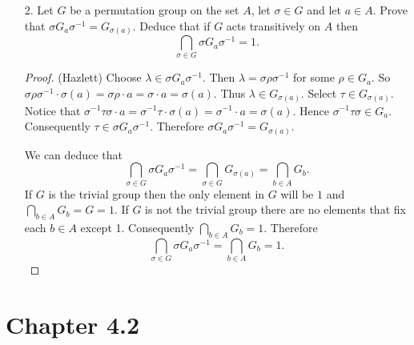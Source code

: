 \documentclass[10pt]{article}
\newcommand\inv{^{-1}}
\begin{document}
\begin{itemize}
\begin{proof}
\end{proof}

\item[2.] Let $G$ be a permutation group on the set $A$, let $\sigma \in G$ and let $a \in A$.  Prove that $\sigma G_a\sigma\inv = G_{\sigma(a)}$.  Deduce that if $G$ acts transitively on $A$ then $$\bigcap_{\sigma \in G}\sigma G_a\sigma\inv = 1.$$

\begin{proof}(Hazlett)
Choose $\lambda \in \sigma G_a\sigma\inv$.  Then $\lambda = \sigma
\rho \sigma\inv$ for some $\rho \in G_a$.  So $\sigma\rho \sigma\inv
\cdot \sigma(a) = \sigma\rho\cdot a = \sigma \cdot a = \sigma(a)$.
Thus $\lambda \in G_{\sigma(a)}$.  Select $\tau \in G_{\sigma(a)}$.
Notice that $\sigma\inv\tau\sigma\cdot a = \sigma\inv\tau
\cdot\sigma(a) = \sigma\inv \cdot a = \sigma(a)$.  Hence
$\sigma\inv\tau\sigma \in G_a$.  Consequently $\tau \in \sigma
G_a\sigma\inv$.  Therefore $\sigma G_a\sigma\inv = G_{\sigma(a)}$.

We can deduce that $$\bigcap_{\sigma \in G}\sigma G_a\sigma\inv =
\bigcap_{\sigma \in G} G_{\sigma(a)} = \bigcap_{b \in A} G_b.$$  If
$G$ is the trivial group then the only element in $G$ will be $1$
and $\bigcap_{b \in A} G_b = G = 1$.  If $G$ is not the trivial
group there are no elements that fix each $b \in A$ except 1.
Consequently $\bigcap_{b \in A} G_b = 1$.  Therefore
$$\bigcap_{\sigma \in G}\sigma G_a\sigma\inv = \bigcap_{b \in A} G_b
= 1.$$
\end{proof}

\end{itemize}

\section*{Chapter 4.2}
\end{document}
